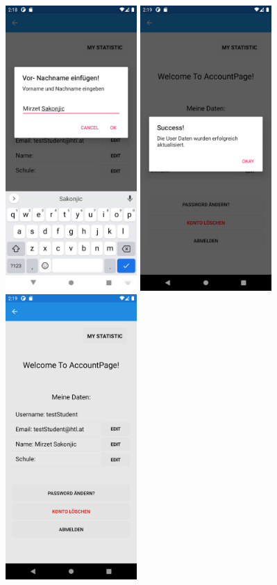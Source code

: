 \begin{figure}[h]
    \begin{center}
    \includegraphics[width=5cm]{pics/Xamarin Student/14 Name.png}\hfill
    \includegraphics[width=5cm]{pics/Xamarin Student/15 Name success.png}\hfill
    \includegraphics[width=5cm]{pics/Xamarin Student/16 Name.png}

\end{center}
\end{figure}
